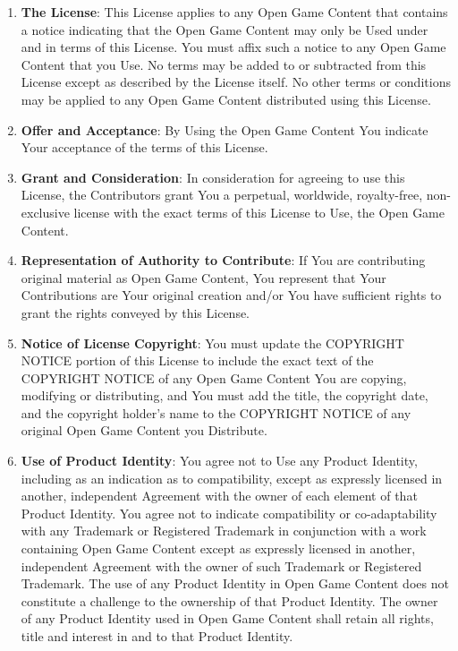 \begin{small}
\begin{enumerate}
\item \textbf{The License}: This License applies to any Open Game Content that contains a notice indicating that the Open Game Content may only be Used under and in terms of this License. You must affix such a notice to any Open Game Content that you Use. No terms may be added to or subtracted from this License except as described by the License itself. No other terms or conditions may be applied to any Open Game Content distributed using this License. 

\item \textbf{Offer and Acceptance}: By Using the Open Game Content You indicate Your acceptance of the terms of this License. 

\item \textbf{Grant and Consideration}: In consideration for agreeing to use this License, the Contributors grant You a perpetual, worldwide, royalty-free, non-exclusive license with the exact terms of this License to Use, the Open Game Content. 

\item \textbf{Representation of Authority to Contribute}: If You are contributing original material as Open Game Content, You represent that Your Contributions are Your original creation and/or You have sufficient rights to grant the rights conveyed by this License. 

\item \textbf{Notice of License Copyright}: You must update the COPYRIGHT NOTICE portion of this License to include the exact text of the COPYRIGHT NOTICE of any Open Game Content You are copying, modifying or distributing, and You must add the title, the copyright date, and the copyright holder's name to the COPYRIGHT NOTICE of any original Open Game Content you Distribute. 

\item \textbf{Use of Product Identity}: You agree not to Use any Product Identity, including as an indication as to compatibility, except as expressly licensed in another, independent Agreement with the owner of each element of that Product Identity. You agree not to indicate compatibility or co-adaptability with any Trademark or Registered Trademark in conjunction with a work containing Open Game Content except as expressly licensed in another, independent Agreement with the owner of such Trademark or Registered Trademark. The use of any Product Identity in Open Game Content does not constitute a challenge to the ownership of that Product Identity. The owner of any Product Identity used in Open Game Content shall retain all rights, title and interest in and to that Product Identity. 


\end{enumerate}
\end{small}
